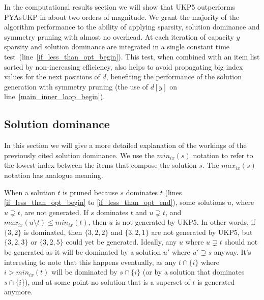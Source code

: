 \documentclass[runningheads,a4paper]{llncs}
\begin{document}
In the computational results section we will show that UKP5 outperforms PYAsUKP in about two orders of magnitude.
We grant the majority of the algorithm performance to the ability of applying sparsity, solution dominance and symmetry pruning with almost no overhead.
At each iteration of capacity \(y\) sparsity and solution dominance are integrated in a single constant time test~(line~\ref{if_less_than_opt_begin}).
This test, when combined with an item list sorted by non-increasing efficiency, also helps to avoid propagating big index values for the next positions of \(d\), benefiting the performance of the solution generation with symmetry pruning (the use of \(d[y]\) on line~\ref{main_inner_loop_begin}).

\subsection{Solution dominance}

In this section we will give a more detailed explanation of the workings of the previously cited solution dominance. We use the \(min_{ix}(s)\) notation to refer to the lowest index between the items that compose the solution \(s\). The \(max_{ix}(s)\) notation has analogue meaning.

When a solution \(t\) is pruned because \(s\) dominates \(t\) (lines \ref{if_less_than_opt_begin} to \ref{if_less_than_opt_end}), some solutions \(u\), where \(u \supsetneq t\), are not generated. 
If \(s\) dominates \(t\) and \(u \supsetneq t\), and \(max_{ix}(u\setminus t) \leq min_{ix}(t)\), then \(u\) is not generated by UKP5. 
In other words, if \(\{3, 2\}\) is dominated, then \(\{3, 2, 2\}\) and \(\{3, 2, 1\}\) are not generated by UKP5, but \(\{3,2,3\}\) or \(\{3,2,5\}\) could yet be generated.
Ideally, any \(u\) where \(u \supsetneq t\) should not be generated as it will be dominated by a solution \(u'\) where \(u' \supsetneq s\) anyway. 
It's interesting to note that this happens eventually, as any \(t \cap \{i\}\) where \(i > min_{ix}(t)\) will be dominated by \(s \cap \{i\}\) (or by a solution that dominates \(s \cap \{i\}\)), and at some point no solution that is a superset of \(t\) is generated anymore.

\end{document}
